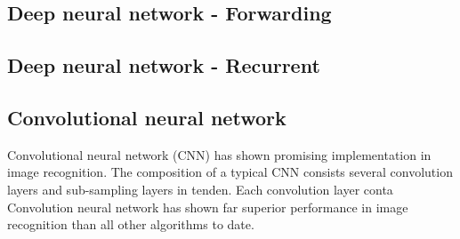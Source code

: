 \subsection{Deep neural network - Forwarding}
\subsection{Deep neural network - Recurrent}
\subsection{Convolutional neural network}
Convolutional neural network (CNN) has shown promising implementation in image recognition. The composition of a typical CNN consists several convolution layers and sub-sampling layers in tenden. Each convolution layer conta
Convolution neural network has shown far superior performance in image recognition than all other algorithms to date.~\cite{Szegedy_2015}